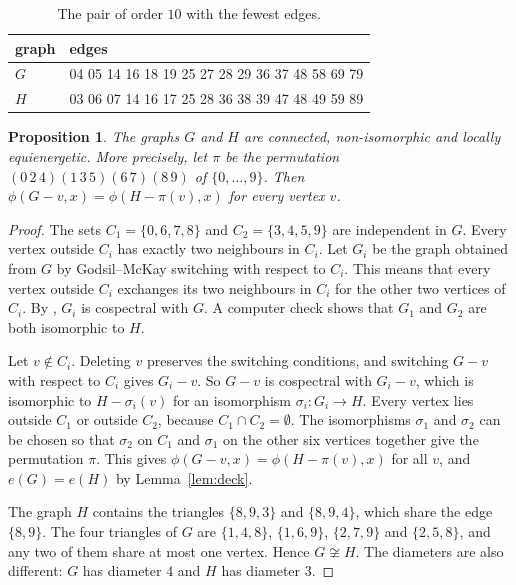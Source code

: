 \documentclass[11pt]{amsart}
\newtheorem{proposition}[theorem]{Proposition}
\theoremstyle{remark}
\begin{document}
\begin{table}[ht]
\caption{The pair of order $10$ with the fewest edges.}\label{tab:ten}
\begin{tabular}{ll}
\toprule
graph & edges\\
\midrule
$G$ & 04 05 14 16 18 19 25 27 28 29 36 37 48 58 69 79\\
$H$ & 03 06 07 14 16 17 25 28 36 38 39 47 48 49 59 89\\
\bottomrule
\end{tabular}
\end{table}

\begin{proposition}\label{prop:ten}
The graphs $G$ and $H$ are connected, non-isomorphic and locally equienergetic.
More precisely, let $\pi$ be the permutation $(0\,2\,4)(1\,3\,5)(6\,7)(8\,9)$ of $\{0,\dots,9\}$.
Then $\phi(G-v,x)=\phi(H-\pi(v),x)$ for every vertex $v$.
\end{proposition}

\begin{proof}
The sets $C_1=\{0,6,7,8\}$ and $C_2=\{3,4,5,9\}$ are independent in $G$.
Every vertex outside $C_i$ has exactly two neighbours in $C_i$.
Let $G_i$ be the graph obtained from $G$ by Godsil--McKay switching with respect to $C_i$.
This means that every vertex outside $C_i$ exchanges its two neighbours in $C_i$ for the other two vertices of $C_i$.
By \cite{GM82}, $G_i$ is cospectral with $G$.
A computer check shows that $G_1$ and $G_2$ are both isomorphic to $H$.

Let $v\notin C_i$.
Deleting $v$ preserves the switching conditions, and switching $G-v$ with respect to $C_i$ gives $G_i-v$.
So $G-v$ is cospectral with $G_i-v$, which is isomorphic to $H-\sigma_i(v)$ for an isomorphism $\sigma_i\colon G_i\to H$.
Every vertex lies outside $C_1$ or outside $C_2$, because $C_1\cap C_2=\emptyset$.
The isomorphisms $\sigma_1$ and $\sigma_2$ can be chosen so that $\sigma_2$ on $C_1$ and $\sigma_1$ on the other six vertices together give the permutation $\pi$.
This gives $\phi(G-v,x)=\phi(H-\pi(v),x)$ for all $v$, and $e(G)=e(H)$ by Lemma~\ref{lem:deck}.

The graph $H$ contains the triangles $\{8,9,3\}$ and $\{8,9,4\}$, which share the edge $\{8,9\}$.
The four triangles of $G$ are $\{1,4,8\}$, $\{1,6,9\}$, $\{2,7,9\}$ and $\{2,5,8\}$, and any two of them share at most one vertex.
Hence $G\not\cong H$.
The diameters are also different: $G$ has diameter $4$ and $H$ has diameter $3$.
\end{proof}
\end{document}
